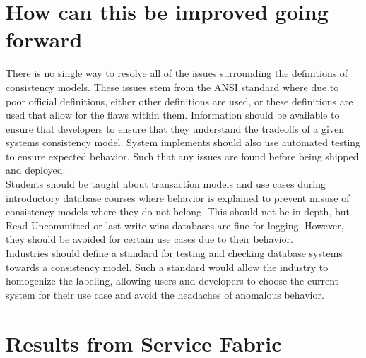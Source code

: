 \documentclass[a4paper,10pt,titlepage]{report}
\begin{document}
\section{How can this be improved going forward}

There is no single way to resolve all of the issues surrounding the definitions of consistency models. These issues stem from the ANSI\cite{ansisql1999} standard where due to poor official definitions, either other definitions are used, or these definitions are used that allow for the flaws within them. Information should be available to ensure that developers to ensure that they understand the tradeoffs of a given systems consistency model. System implements should also use automated testing to ensure expected behavior. Such that any issues are found before being shipped and deployed. \\
\vspace{5mm}
Students should be taught about transaction models and use cases during introductory database courses where behavior is explained to prevent misuse of consistency models where they do not belong. This should not be in-depth, but Read Uncommitted or last-write-wins databases are fine for logging. However, they should be avoided for certain use cases due to their behavior.\\
\vspace{5mm}
Industries should define a standard for testing and checking database systems towards a consistency model. Such a standard would allow the industry to homogenize the labeling, allowing users and developers to choose the current system for their use case and avoid the headaches of anomalous behavior.

\section{Results from Service Fabric}
\end{document}
